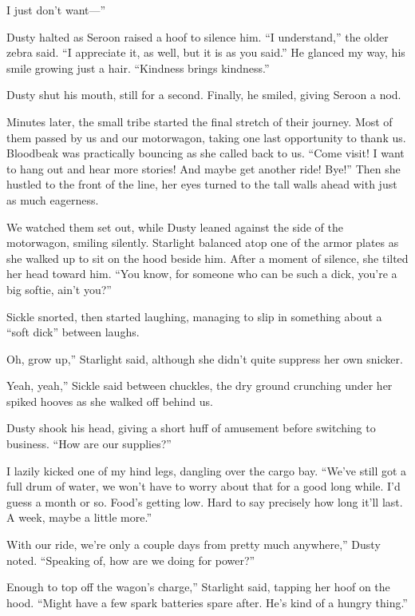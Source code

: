 \leavevmode{}I just don’t want—”

Dusty halted as Seroon raised a hoof to silence him. “I understand,” the older zebra said. “I appreciate it, as well, but it is as you said.” He glanced my way, his smile growing just a hair. “Kindness brings kindness.”

Dusty shut his mouth, still for a second. Finally, he smiled, giving Seroon a nod.

Minutes later, the small tribe started the final stretch of their journey. Most of them passed by us and our motorwagon, taking one last opportunity to thank us. Bloodbeak was practically bouncing as she called back to us. “Come visit! I want to hang out and hear more stories! And maybe get another ride! Bye!” Then she hustled to the front of the line, her eyes turned to the tall walls ahead with just as much eagerness.

We watched them set out, while Dusty leaned against the side of the motorwagon, smiling silently. Starlight balanced atop one of the armor plates as she walked up to sit on the hood beside him. After a moment of silence, she tilted her head toward him. “You know, for someone who can be such a dick, you’re a big softie, ain’t you?”

Sickle snorted, then started laughing, managing to slip in something about a “soft dick” between laughs.

\leavevmode{}Oh, grow up,” Starlight said, although she didn’t quite suppress her own snicker.

\leavevmode{}Yeah, yeah,” Sickle said between chuckles, the dry ground crunching under her spiked hooves as she walked off behind us.

Dusty shook his head, giving a short huff of amusement before switching to business. “How are our supplies?”

I lazily kicked one of my hind legs, dangling over the cargo bay. “We’ve still got a full drum of water, we won’t have to worry about that for a good long while. I’d guess a month or so. Food’s getting low. Hard to say precisely how long it’ll last. A week, maybe a little more.”

\leavevmode{}With our ride, we’re only a couple days from pretty much anywhere,” Dusty noted. “Speaking of, how are we doing for power?”

\leavevmode{}Enough to top off the wagon’s charge,” Starlight said, tapping her hoof on the hood. “Might have a few spark batteries spare after. He’s kind of a hungry thing.”

